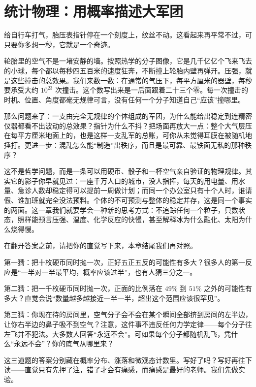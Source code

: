 \chapter{统计物理：用概率描述大军团}


给自行车打气，胎压表指针停在一个刻度上，纹丝不动。这看起来再平常不过，可只要你多想一秒，它就是一个奇迹。

轮胎里的空气不是一堵安静的墙。按照热学的分子图像，它是几千亿亿个飞来飞去的小球，每个都以每秒四五百米的速度狂奔，不断撞上轮胎内壁再弹开。压强，就是这些撞击的总效果。我们来数一数：在通常的气压下，每平方厘米的器壁，每秒要承受大约 \(10^{23}\) 次撞击。这个数写出来是一后面跟着二十三个零。每一次撞击的时机、位置、角度都毫无规律可言，没有任何一个分子知道自己“应该”撞哪里。

那么问题来了：一支由完全无规律的个体组成的军团，为什么能给出稳定到连精密仪器都看不出波动的总效果？指针为什么不抖？把场面再放大一点：整个大气层压在每平方厘米地面上的，也是这样一支乱军的总账，可你从未觉得耳膜在被随机地捶打。更进一步：混乱怎么能“制造”出秩序，而且是最可靠、最铁面无私的那种秩序？

这不是哲学问题，而是一条可以用硬币、骰子和一杯空气亲自验证的物理规律。其实它的影子你早就见过：一座千万人口的城市，没人指挥，每天的用电量、用水量、急诊人数却稳定得可以提前一周做计划；而同一个办公室只有十个人时，谁请假、谁加班就完全没法预料。个体的不可预测与整体的稳定并存，这是同一个事实的两面。这一章我们就要学会一种新的思考方式：不追踪任何一个粒子，只数状态，照样能预言压强、温度、化学反应的快慢，甚至解释冰为什么融化、太阳为什么烧得慢。


在翻开答案之前，请把你的直觉写下来，本章结尾我们再对照。

第一猜：把十枚硬币同时抛一次，正好五正五反的可能性有多大？很多人的第一反应是“一半对一半最平均，概率应该过半”，也有人猜三分之一。

第二猜：把一千枚硬币同时抛一次，正面的比例落在 \(49\%\) 到 \(51\%\) 之外的可能性有多大？直觉会说“数量越多越接近一半一半，超出这个范围应该很罕见”。

第三猜：你现在待的房间里，空气分子会不会在某个瞬间全部挤到房间的左半边，让你右半边的鼻子吸不到空气？注意，这件事不违反任何力学定律——每个分子往左飞并不犯法。大多数人回答“永远不会”。可如果每个分子都随机乱飞，凭什么“永远不会”？你的底气从哪里来？

这三道题的答案分别藏在概率分布、涨落和微观态计数里。写好了吗？写好再往下读——直觉只有先押了注，错了才会有痛感，而痛感是最好的老师。我们先做实验。

